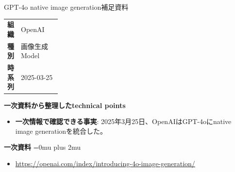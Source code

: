 \begin{technicalnote}{GPT-4o native image generation}{補足資料}
\begingroup
\begin{tabularx}{\linewidth}{@{}>{\bfseries}p{0.22\linewidth}X@{}}
組織 & OpenAI \\
種別 & 画像生成Model \\
時系列 & 2025-03-25 \\
\end{tabularx}
\smallskip
\begin{minipage}{\linewidth}
{\bfseries 一次資料から整理したtechnical points}
\begin{itemize}[leftmargin=1.5em,itemsep=0.35em]
\item \textbf{一次情報で確認できる事実}: 2025年3月25日、OpenAIはGPT-4oにnative image generationを統合した。
\end{itemize}
\begin{samepage}
{\bfseries 一次資料}
\begingroup\sloppy
\Urlmuskip=0mu plus 2mu\relax
\begin{itemize}[leftmargin=1.5em,itemsep=0.25em]
\item {\scriptsize\url{https://openai.com/index/introducing-4o-image-generation/}}
\end{itemize}
\endgroup
\end{samepage}
\end{minipage}
\endgroup
\end{technicalnote}
\medskip

